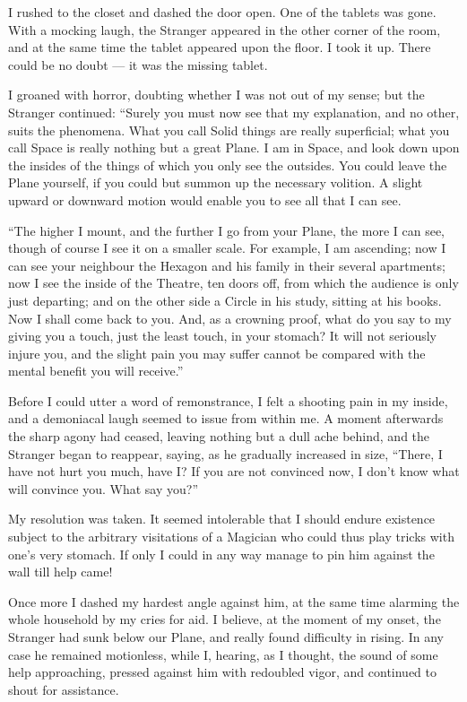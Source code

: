 \documentclass[12pt, a4paper, oneside]{memoir}
\begin{document}
I rushed to the closet and dashed the door open. One of the tablets was gone.
With a mocking laugh, the Stranger appeared in the other corner of the room,
and at the same time the tablet appeared upon the floor. I took it up. There
could be no doubt --- it was the missing tablet.

I groaned with horror, doubting whether I was not out of my sense; but the
Stranger continued: ``Surely you must now see that my explanation, and no
other, suits the phenomena. What you call Solid things are really superficial;
what you call Space is really nothing but a great Plane. I am in Space, and
look down upon the insides of the things of which you only see the outsides.
You could leave the Plane yourself, if you could but summon up the necessary
volition. A slight upward or downward motion would enable you to see all that
I can see.

``The higher I mount, and the further I go from your Plane, the more I can see,
though of course I see it on a smaller scale. For example, I am ascending; now
I can see your neighbour the Hexagon and his family in their several
apartments; now I see the inside of the Theatre, ten doors off, from which the
audience is only just departing; and on the other side a Circle in his study,
sitting at his books. Now I shall come back to you. And, as a crowning proof,
what do you say to my giving you a touch, just the least touch, in your
stomach? It will not seriously injure you, and the slight pain you may suffer
cannot be compared with the mental benefit you will receive.''

Before I could utter a word of remonstrance, I felt a shooting pain in my
inside, and a demoniacal laugh seemed to issue from within me. A moment
afterwards the sharp agony had ceased, leaving nothing but a dull ache behind,
and the Stranger began to reappear, saying, as he gradually increased in size,
``There, I have not hurt you much, have I? If you are not convinced now, I
don't know what will convince you. What say you?''

My resolution was taken. It seemed intolerable that I should endure existence
subject to the arbitrary visitations of a Magician who could thus play tricks
with one's very stomach. If only I could in any way manage to pin him against
the wall till help came!

Once more I dashed my hardest angle against him, at the same time alarming the
whole household by my cries for aid. I believe, at the moment of my onset, the
Stranger had sunk below our Plane, and really found difficulty in rising. In
any case he remained motionless, while I, hearing, as I thought, the sound of
some help approaching, pressed against him with redoubled vigor, and continued
to shout for assistance.
\end{document}
